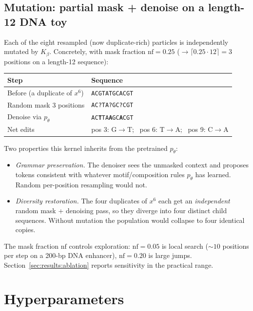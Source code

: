 \subsection{Mutation: partial mask + denoise on a length-12 DNA toy}

Each of the eight resampled (now duplicate-rich) particles is independently mutated by $K_\beta$. Concretely, with mask fraction $\mathrm{nf}\!=\!0.25$ ($\!\to\!\lceil 0.25\!\cdot\!12\rceil\!=\!3$ positions on a length-12 sequence):
\begin{center}
\begin{tabular}{ll}
\toprule
\textbf{Step}        & \textbf{Sequence} \\
\midrule
Before (a duplicate of $x^6$)   & \texttt{ACGTATGCACGT} \\
Random mask 3 positions          & \texttt{AC?TA?GC?CGT} \\
Denoise via $p_\theta$           & \texttt{AC\textbf{T}TA\textbf{A}GC\textbf{A}CGT} \\
\midrule
Net edits                         & pos 3: G$\to$T; \, pos 6: T$\to$A; \, pos 9: C$\to$A \\
\bottomrule
\end{tabular}
\end{center}
Two properties this kernel inherits from the pretrained $p_\theta$:
\begin{itemize}
\item \emph{Grammar preservation.} The denoiser sees the unmasked context and proposes tokens consistent with whatever motif/composition rules $p_\theta$ has learned. Random per-position resampling would not.
\item \emph{Diversity restoration.} The four duplicates of $x^6$ each get an \emph{independent} random mask + denoising pass, so they diverge into four distinct child sequences. Without mutation the population would collapse to four identical copies.
\end{itemize}
The mask fraction $\mathrm{nf}$ controls exploration: $\mathrm{nf}\!=\!0.05$ is local search ($\sim\!10$ positions per step on a 200-bp DNA enhancer), $\mathrm{nf}\!=\!0.20$ is large jumps. Section~\ref{sec:results:ablation} reports sensitivity in the practical range.

\section{Hyperparameters}\label{app:hyper}

